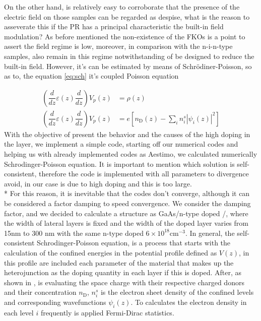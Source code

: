 On the other hand, is relatively easy to corroborate that the presence of the electric field on those samples can be regarded as despise, what is the reason to asseverate this if the PR has a principal characteristic the built-in field modulation?
As before mentioned the non-existence of the FKOs is a point to assert the field regime is low, moreover, in comparison with the n-i-n-type samples, also remain in this regime notwithstanding of be designed to reduce the built-in field. However, it's can be estimated by means of Schr\"odiner-Poisson, so as to, the equation  \cref{eq:sch} it's coupled Poisson equation\cite{jirauschek2014modeling,harrison2016chap3}

\begin{align}
	\left(\dfrac{d}{dz}\varepsilon(z)\dfrac{d}{dz}\right) V_{p}(z)&=\rho (z)
	\label{eq:chapter-3-poisson-equation-1}\\
	\left(\dfrac{d}{dz}\varepsilon(z)\dfrac{d}{dz}\right) V_{p}(z)&=e\left[n_{\mathrm{D}}(z)-\sum_{i}n_{i}^{s}\left|\psi_{i}(z)\right|^2\right]
	\label{eq:chapter-3-poisson-equation-2}
\end{align}
With the objective of present the behavior and the causes of the high doping in the \algaas layer, we implement a simple code, starting off our numerical codes and helping us with already implemented codes as Aestimo\cite{hebal2021general},  we calculated numerically Schrodinger-Poisson equation. It is important to mention which solution is self-consistent, therefore the code is implemented with all parameters to divergence avoid,  in our case is due to high doping and this is too large.\\*
For this reason, it is inevitable that the codes don't converge, although it can be considered a factor damping to speed convergence\cite{ram2004theschrodinger}.
We consider the damping factor, and we decided to calculate a structure as GaAs/n-type doped \algaas/\algaas, where the width of lateral layers is fixed and the width of the doped layer varies from 15nm to 300 nm with the same n-type doped $6\times 10^{18} \mathrm{cm^{-3}}$.
In general, the self-consistent Schrodinger-Poisson equation, is a process that starts with the calculation of the confined energies in the potential profile defined as $V(z)$,  in this profile are included each parameter of the material that makes up the heterojunction as the doping quantity in each layer if this is doped. After, as shown in , is evaluating the space charge with their respective charged donors and their concentration $n_{\mathrm{D}}$,  $n_{i}^{s}$ is the electron sheet density of the confined levels and corresponding wavefunctions $\psi_{i}(z)$. To  calculates the electron density in each level $i$ frequently is applied Fermi-Dirac statistics\cite{cassan2000onthereduction,ando1987calculation,bastard1990wave}. 

